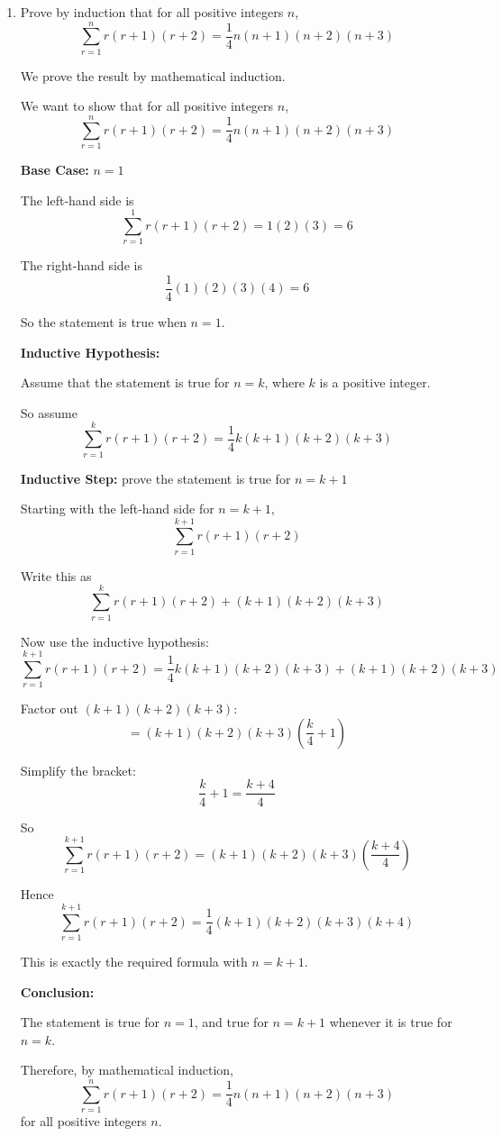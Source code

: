 \documentclass[leqno]{article}
\newcommand{\questionitem}{%
  \item\phantomsection
  \addcontentsline{toc}{section}{Question \number\value{enumi}}%
}
\begin{document}
\begin{enumerate}[
  label=\textbf{\arabic*.},
  leftmargin=*,
  topsep=0pt,
  partopsep=0pt,
  parsep=0pt
]
\newpage

\questionitem

Prove by induction that for all positive integers $n$,
\[
\sum_{r=1}^{n} r(r+1)(r+2)=\frac{1}{4}n(n+1)(n+2)(n+3)
\]

\vspace*{30pt}

\begin{tcolorbox}[colback=white, colframe=scarlet, title={\textbf{Solution}}, breakable, grow to left by=6mm, grow to right by=10mm]
We prove the result by mathematical induction.

We want to show that for all positive integers $n$,
\[
\sum_{r=1}^{n} r(r+1)(r+2)=\frac{1}{4}n(n+1)(n+2)(n+3)
\]

\textbf{Base Case:} $n=1$

The left-hand side is
\[
\sum_{r=1}^{1} r(r+1)(r+2)=1(2)(3)=6
\]

The right-hand side is
\[
\frac{1}{4}(1)(2)(3)(4)=6
\]

So the statement is true when $n=1$.

\textbf{Inductive Hypothesis:}

Assume that the statement is true for $n=k$, where $k$ is a positive integer.

So assume
\[
\sum_{r=1}^{k} r(r+1)(r+2)=\frac{1}{4}k(k+1)(k+2)(k+3)
\]

\textbf{Inductive Step:} prove the statement is true for $n=k+1$

Starting with the left-hand side for $n=k+1$,
\[
\sum_{r=1}^{k+1} r(r+1)(r+2)
\]

Write this as
\[
\sum_{r=1}^{k} r(r+1)(r+2) + (k+1)(k+2)(k+3)
\]

Now use the inductive hypothesis:
\[
\sum_{r=1}^{k+1} r(r+1)(r+2)
=
\frac{1}{4}k(k+1)(k+2)(k+3) + (k+1)(k+2)(k+3)
\]

Factor out $(k+1)(k+2)(k+3)$:
\[
=
(k+1)(k+2)(k+3)\left(\frac{k}{4}+1\right)
\]

Simplify the bracket:
\[
\frac{k}{4}+1=\frac{k+4}{4}
\]

So
\[
\sum_{r=1}^{k+1} r(r+1)(r+2)
=
(k+1)(k+2)(k+3)\left(\frac{k+4}{4}\right)
\]

Hence
\[
\sum_{r=1}^{k+1} r(r+1)(r+2)
=
\frac{1}{4}(k+1)(k+2)(k+3)(k+4)
\]

This is exactly the required formula with $n=k+1$.

\textbf{Conclusion:}

The statement is true for $n=1$, and true for $n=k+1$ whenever it is true for $n=k$.

Therefore, by mathematical induction,
\[
\sum_{r=1}^{n} r(r+1)(r+2)=\frac{1}{4}n(n+1)(n+2)(n+3)
\]
for all positive integers $n$.
\end{tcolorbox}


\end{enumerate}
\end{document}
